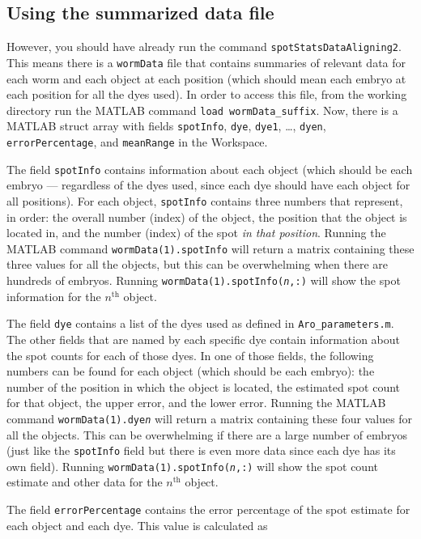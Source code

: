 \documentclass[titlepage,11pt]{article}
\begin{document}
\subsection{Using the summarized data file} \label{sec:datasummary}

However, you should have already run the command \texttt{spotStatsDataAligning2}. This means there is a \texttt{wormData} file that contains summaries of relevant data for each worm and each object at each position (which should mean each embryo at each position for all the dyes used). In order to access this file, from the working directory run the MATLAB command \texttt{load wormData\_suffix}. Now, there is a MATLAB struct array with fields \texttt{spotInfo}, \texttt{dye}, \texttt{dye1}, \ldots, \texttt{dyen}, \texttt{errorPercentage}, and \texttt{meanRange} in the Workspace.

The field \texttt{spotInfo} contains information about each object (which should be each embryo --- regardless of the dyes used, since each dye should have each object for all positions). For each object, \texttt{spotInfo} contains three numbers that represent, in order: the overall number (index) of the object, the position that the object is located in, and the number (index) of the spot \emph{in that position}. Running the MATLAB command \texttt{wormData(1).spotInfo} will return a matrix containing these three values for all the objects, but this can be overwhelming when there are hundreds of embryos. Running \texttt{wormData(1).spotInfo(\textit{n},:)} will show the spot information for the $n^{\text{th}}$ object.

The field \texttt{dye} contains a list of the dyes used as defined in \texttt{Aro\_parameters.m}. The other fields that are named by each specific dye contain information about the spot counts for each of those dyes. In one of those fields, the following numbers can be found for each object (which should be each embryo): the number of the position in which the object is located, the estimated spot count for that object, the upper error, and the lower error. Running the MATLAB command \texttt{wormData(1).dye\textit{n}} will return a matrix containing these four values for all the objects. This can be overwhelming if there are a large number of embryos (just like the \texttt{spotInfo} field but there is even more data since each dye has its own field). Running \texttt{wormData(1).spotInfo(\textit{n},:)} will show the spot count estimate and other data for the $n^{\text{th}}$ object.

The field \texttt{errorPercentage} contains the error percentage of the spot estimate for each object and each dye. This value is calculated as 
\end{document}
